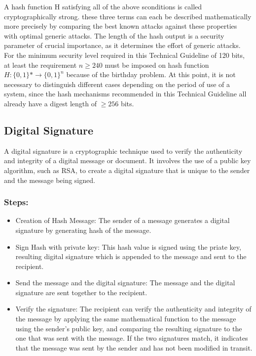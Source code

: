 A hash function H satisfying all of the above sconditions is called cryptographically strong.
these three terms can each be described mathematically more precisely by comparing the best
known attacks against these properties with optimal generic attacks. The length of the hash output
is a security parameter of crucial importance, as it determines the effort of generic attacks. For the
minimum security level required in this Technical Guideline of 120 bits, at least the requirement
$n\ge240$ must be imposed on hash function $H:\{0,1\}*\to \{0,1\}^n$  because of the birthday problem.
At this point, it is not necessary to distinguish different cases depending on the period of use of
a system, since the hash mechanisms recommended in this Technical Guideline all already have a
digest length of $ \ge 256 $ bits. \cite{bsi2020}


\subsection*{Digital Signature}
A digital signature is a cryptographic technique used to verify the authenticity and integrity of a digital message or document.
It involves the use of a public key algorithm, such as RSA, to create a digital signature that is unique to the sender and the message being signed.
\subsubsection{Steps:}
\begin{itemize}
	\item Creation of Hash Message: The sender of a message generates a digital signature by generating hash of the message.
	\item Sign Hash with private key: This hash value is signed using the priate key, resulting digital signature which is appended to the message and sent to the
	      recipient.
	\item Send the message and the digital signature: The message and the digital signature are sent together to the recipient.
	\item Verify the signature: The recipient can verify the authenticity and integrity of the message by applying the same
	      mathematical function to the message using the sender's public key, and comparing the resulting signature to the one that was sent with the message.
	      If the two signatures match, it indicates that the message was sent by the sender and has not been modified in transit.
\end{itemize}

